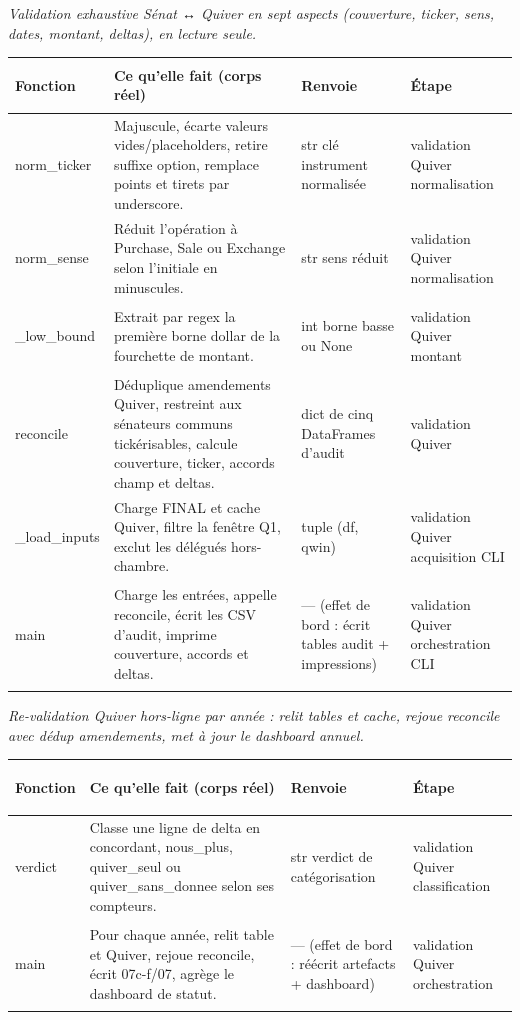 \documentclass[11pt,a4paper]{article}
\makeatletter
\newenvironment{fnt}{%
  \par\footnotesize
  \setlength{\tabcolsep}{3pt}%
  \begin{longtable}{@{}>{\ttfamily\scriptsize\raggedright\arraybackslash}p{3.0cm} >{\raggedright\arraybackslash}p{7.5cm} >{\itshape\scriptsize\raggedright\arraybackslash}p{2.7cm} >{\scriptsize\raggedright\arraybackslash}p{1.85cm}@{}}
  \toprule
  \normalfont\bfseries\scriptsize Fonction & \bfseries\scriptsize Ce qu'elle fait (corps réel) &
  \normalfont\bfseries\scriptsize Renvoie & \normalfont\bfseries\scriptsize Étape\\
  \midrule\endhead
}{\bottomrule\end{longtable}\par}
\newcommand{\fnmod}[2]{\par\smallskip\noindent{\ttfamily\bfseries #1}\;\textmd{\itshape\small\textemdash{} #2}\par\nobreak\vspace{2pt}}
\makeatother
\begin{document}
\fnmod{quiver_audit.py}{Validation exhaustive Sénat ↔ Quiver en sept aspects (couverture, ticker, sens, dates, montant, deltas), en lecture seule.}
\begin{fnt}
norm_\allowbreak ticker & Majuscule,\allowbreak{} écarte valeurs vides/\allowbreak{}placeholders,\allowbreak{} retire suffixe option,\allowbreak{} remplace points et tirets par underscore. & str clé instrument normalisée & validation Quiver normalisation \\
norm_\allowbreak sense & Réduit l'opération à Purchase,\allowbreak{} Sale ou Exchange selon l'initiale en minuscules. & str sens réduit & validation Quiver normalisation \\
_\allowbreak low_\allowbreak bound & Extrait par regex la première borne dollar de la fourchette de montant. & int borne basse ou None & validation Quiver montant \\
reconcile & Déduplique amendements Quiver,\allowbreak{} restreint aux sénateurs communs tickérisables,\allowbreak{} calcule couverture,\allowbreak{} ticker,\allowbreak{} accords champ et deltas. & dict de cinq DataFrames d'audit & validation Quiver \\
_\allowbreak load_\allowbreak inputs & Charge FINAL et cache Quiver,\allowbreak{} filtre la fenêtre Q1,\allowbreak{} exclut les délégués hors-chambre. & tuple (df,\allowbreak{} qwin)\allowbreak{} & validation Quiver acquisition CLI \\
main & Charge les entrées,\allowbreak{} appelle reconcile,\allowbreak{} écrit les CSV d'audit,\allowbreak{} imprime couverture,\allowbreak{} accords et deltas. & — (effet de bord : écrit tables audit + impressions)\allowbreak{} & validation Quiver orchestration CLI \\
\end{fnt}
\fnmod{revalidate_quiver.py}{Re-validation Quiver hors-ligne par année : relit tables et cache, rejoue reconcile avec dédup amendements, met à jour le dashboard annuel.}
\begin{fnt}
verdict & Classe une ligne de delta en concordant,\allowbreak{} nous_plus,\allowbreak{} quiver_seul ou quiver_sans_donnee selon ses compteurs. & str verdict de catégorisation & validation Quiver classification \\
main & Pour chaque année,\allowbreak{} relit table et Quiver,\allowbreak{} rejoue reconcile,\allowbreak{} écrit 07c-f/\allowbreak{}07,\allowbreak{} agrège le dashboard de statut. & — (effet de bord : réécrit artefacts + dashboard)\allowbreak{} & validation Quiver orchestration \\
\end{fnt}
\end{document}
